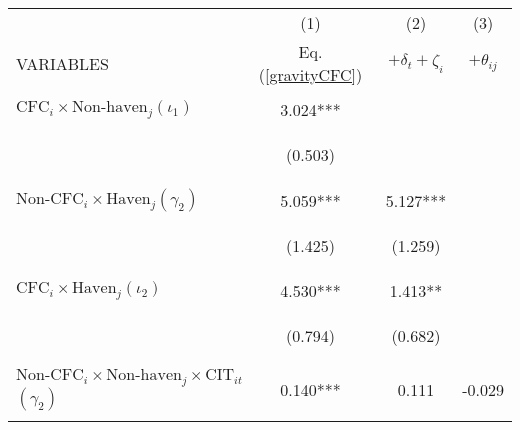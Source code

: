 \begin{center}
\begin{tabular}{lccc} \hline
 & (1) & (2) & (3) \\
VARIABLES & Eq. (\ref{gravityCFC}) & $+\delta_t+\zeta_i$ & $+\theta_{ij}$ \\ \hline
\vspace{4pt} & \begin{footnotesize}\end{footnotesize} & \begin{footnotesize}\end{footnotesize} & \begin{footnotesize}\end{footnotesize} \\
$\text{CFC}_i\times\text{Non-haven}_j$$ (\iota_1)$ & 3.024*** &  &  \\
\vspace{4pt} & \begin{footnotesize}(0.503)\end{footnotesize} & \begin{footnotesize}\end{footnotesize} & \begin{footnotesize}\end{footnotesize} \\
$\text{Non-CFC}_i\times\text{Haven}_j$$ (\gamma_2)$ & 5.059*** & 5.127*** &  \\
\vspace{4pt} & \begin{footnotesize}(1.425)\end{footnotesize} & \begin{footnotesize}(1.259)\end{footnotesize} & \begin{footnotesize}\end{footnotesize} \\
$\text{CFC}_i\times\text{Haven}_j$$ (\iota_2)$ & 4.530*** & 1.413** &  \\
\vspace{4pt} & \begin{footnotesize}(0.794)\end{footnotesize} & \begin{footnotesize}(0.682)\end{footnotesize} & \begin{footnotesize}\end{footnotesize} \\
$\text{Non-CFC}_i\times\text{Non-haven}_j\times\text{CIT}_{it}$ $ (\gamma_2)$ & 0.140*** & 0.111 & -0.029 \\
$$
\end{tabular}
\end{center}
